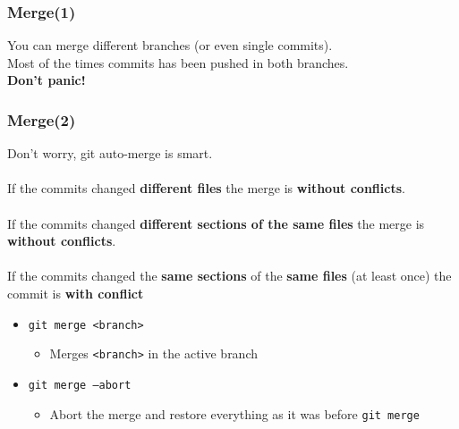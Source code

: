 \documentclass{beamer}
\begin{document}
\begin{frame}
    \frametitle{Merge(1)}
    You can merge different branches (or even single commits).\\
    Most of the times commits has been pushed in both branches. \\
    \textbf{Don't panic!}
    
\end{frame}

\begin{frame}
    \frametitle{Merge(2)}
    Don't worry, git auto-merge is smart.\\
    \hfill \\
    If the commits changed \textbf{different files} the merge is \textbf{without conflicts}.\\
    \hfill \\
    If the commits changed \textbf{different sections of the same files} the merge is \textbf{without conflicts}.\\
    \hfill \\
    If the commits changed the \textbf{same sections} of the \textbf{same files} (at least once) the commit is \textbf{with conflict} \hfill \\
    \begin{itemize}
        \item \texttt{git merge <branch>}
        \begin{itemize}
            \item Merges \texttt{<branch>} in the active branch
        \end{itemize}
        \item \texttt{git merge --abort}
        \begin{itemize}
            \item Abort the merge and restore everything as it was before \texttt{git merge}
        \end{itemize}
    \end{itemize}
\end{frame}
\end{document}
